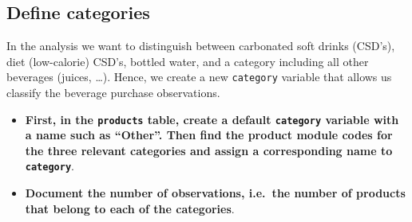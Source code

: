 \documentclass[
]{article}
\newenvironment{Shaded}{\begin{snugshade}}{\end{snugshade}}
\newcommand{\CommentTok}[1]{\textcolor[rgb]{0.56,0.35,0.01}{\textit{#1}}}
\newcommand{\NormalTok}[1]{#1}
\newcommand{\OtherTok}[1]{\textcolor[rgb]{0.56,0.35,0.01}{#1}}
\newcommand{\SpecialCharTok}[1]{\textcolor[rgb]{0.81,0.36,0.00}{\textbf{#1}}}
\newcommand{\StringTok}[1]{\textcolor[rgb]{0.31,0.60,0.02}{#1}}
\providecommand{\tightlist}{%
  \setlength{\itemsep}{0pt}\setlength{\parskip}{0pt}}
\begin{document}
\subsection{Define categories}\label{define-categories}

In the analysis we want to distinguish between carbonated soft drinks
(CSD's), diet (low-calorie) CSD's, bottled water, and a category
including all other beverages (juices, \ldots). Hence, we create a new
\texttt{category} variable that allows us classify the beverage purchase
observations.

\begin{itemize}
\tightlist
\item
  \textbf{First, in the \texttt{products} table, create a default
  \texttt{category} variable with a name such as ``Other''. Then find
  the product module codes for the three relevant categories and assign
  a corresponding name to \texttt{category}}.
\item
  \textbf{Document the number of observations, i.e.~the number of
  products that belong to each of the categories}.
\end{itemize}

\begin{Shaded}
\end{Shaded}
\end{document}
